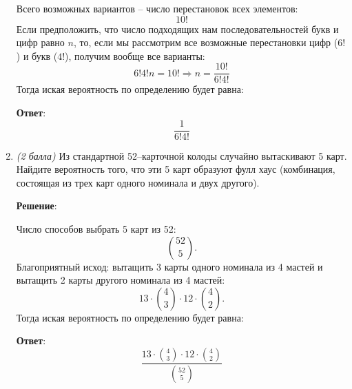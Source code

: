 \documentclass{article}
\begin{document}
\begin{enumerate}
    Всего возможных вариантов -- число перестановок всех элементов:
    \begin{equation}
        10!
    \end{equation}
    Если предположить, что число подходящих нам последовательностей букв и цифр равно $n$, то, если мы рассмотрим все возможные перестановки цифр ($6!$) и букв ($4!$), получим вообще все варианты:
    \begin{equation}
        6!4!n = 10! \Rightarrow n = \frac{10!}{6!4!}
    \end{equation}
    Тогда иская вероятность по определению будет равна:

    \textbf{Ответ}:
    $$\dfrac{1}{6!4!}$$

    \item \textit{(2 балла)} Из стандартной 52–карточной колоды случайно вытаскивают 5 карт. Найдите вероятность того, что эти 5 карт образуют фулл хаус (комбинация, состоящая
    из трех карт одного номинала и двух другого).

    \textbf{Решение}:

    Число способов выбрать 5 карт из 52:
    \begin{equation}
        \binom{52}{5}.
    \end{equation}
    Благоприятный исход: вытащить 3 карты одного номинала из 4 мастей и вытащить 2 карты другого номинала из 4 мастей:
    \begin{equation}
        13 \cdot \binom{4}{3} \cdot 12 \cdot \binom{4}{2}.
    \end{equation}
    Тогда иская вероятность по определению будет равна:

    \textbf{Ответ}:
    $$\dfrac{13 \cdot \binom{4}{3} \cdot 12 \cdot \binom{4}{2}}{\binom{52}{5}}$$



\end{enumerate}
\end{document}
